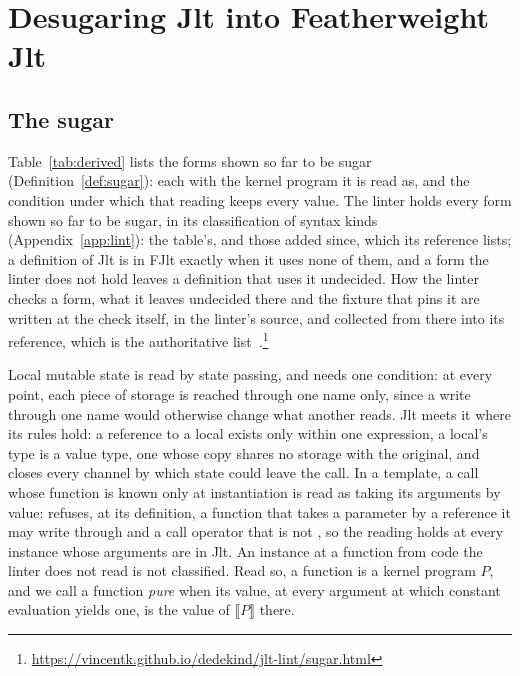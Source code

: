 \section{Desugaring Jlt into Featherweight Jlt}
\label{app:fjlt:closure}

\subsection{The sugar}
\label{app:derived}

Table~\ref{tab:derived} lists the forms shown so far to be sugar (Definition~\ref{def:sugar}): each with the kernel program it is read as, and the condition under which that reading keeps every value.
The linter holds every form shown so far to be sugar, in its classification of syntax kinds (Appendix~\ref{app:lint}): the table's, and those added since, which its reference lists; a definition of Jlt is in FJlt exactly when it uses none of them, and a form the linter does not hold leaves a definition that uses it undecided.
How the linter checks a form, what it leaves undecided there and the fixture that pins it are written at the check itself, in the linter's source, and collected from there into its reference, which is the authoritative list~\cite{Krautler_dedekind_2026}.\footnote{\url{https://vincentk.github.io/dedekind/jlt-lint/sugar.html}}

Local mutable state is read by state passing, and needs one condition: at every point, each piece of storage is reached through one name only, since a write through one name would otherwise change what another reads.
Jlt meets it where its rules hold: a reference to a local exists only within one expression, a local's type is a value type, one whose copy shares no storage with the original, and \RuleOne{} closes every channel by which state could leave the call.
In a template, a call whose function is known only at instantiation is read as taking its arguments by value: \RuleOne{} refuses, at its definition, a function that takes a parameter by a reference it may write through and a call operator that is not , so the reading holds at every instance whose arguments are in Jlt.
An instance at a function from code the linter does not read is not classified.
Read so, a function is a kernel program $P$, and we call a  function \emph{pure} when its value, at every argument at which constant evaluation yields one, is the value of $\llbracket P \rrbracket$ there.

